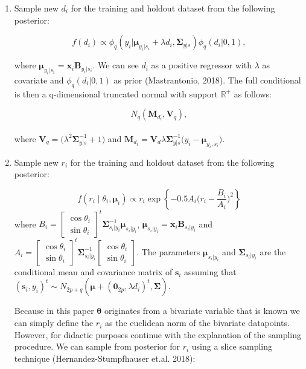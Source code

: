 \documentclass[11pt,]{article}
\begin{document}
\begin{appendices}
\begin{enumerate}
\item Sample new $d_i$ for the training and holdout dataset from the following posterior:

$$f(d_i) \propto \phi_q(y_i|\boldsymbol{\mu}_{y_i|s_i} + \lambda d_i, \boldsymbol{\Sigma}_{y|s})\phi_q(d_i|0, 1),$$

where $\boldsymbol{\mu}_{y_i|s_i} = \boldsymbol{x}_i\boldsymbol{B}_{y_i|s_i}$. We can see $d_i$ as a positive regressor with $\lambda$ as covariate and $\phi_q(d_i|0, 1)$ as prior (Mastrantonio, 2018). The full conditional is then a q-dimensional truncated normal with support $\mathbb{R}^{+}$ as follows:

$$N_q(\boldsymbol{M}_{d_i}, \boldsymbol{V}_q),$$ \\where $\boldsymbol{V}_q = \big(\lambda^2\boldsymbol{\Sigma}_{y|s}^{-1} + 1\big)$ and $\boldsymbol{M}_{d_i} = \boldsymbol{V}_d\lambda\boldsymbol{\Sigma}_{y|s}^{-1}\big(y_i - \boldsymbol{\mu}_{y_i, s_i}\big)$.

\item Sample new $r_i$ for the training and holdout dataset from the following posterior:

$$f(r_i \mid \theta_i, \boldsymbol{\mu}_i) \propto r_i \exp{\left\{-0.5A_i\bigg(r_i-\frac{B_i}{A_i}\bigg)^2\right\}}$$ 
where $B_i = \begin{bmatrix} \cos \theta_i \\ \sin \theta_i\end{bmatrix}^t\boldsymbol{\Sigma}_{s_i|y_i}^{-1}\boldsymbol{\mu}_{s_i|y_i}$, $\boldsymbol{\mu}_{s_i|y_i} = \boldsymbol{x}_i\boldsymbol{B}_{s_i|y_i}$ and $A_i = \begin{bmatrix} \cos \theta_i \\ \sin \theta_i\end{bmatrix}^t\boldsymbol{\Sigma}_{s_i| y_i}^{-1}\begin{bmatrix} \cos \theta_i \\ \sin \theta_i\end{bmatrix}$. The parameters $\boldsymbol{\mu}_{s_i|y_i}$ and $\boldsymbol{\Sigma}_{s_i| y_i}$ are the conditional mean and covariance matrix of $\boldsymbol{s}_i$ assuming that $(\boldsymbol{s}_i, y_i)^t \sim N_{2p+q}(\boldsymbol{\mu} + (\boldsymbol{0}_{2p}, \lambda d_i)^t, \boldsymbol{\Sigma})$.

Because in this paper $\boldsymbol{\theta}$ originates from a bivariate variable that is known we can simply define the $r_i$ as the euclidean norm of the bivariate datapoints. However, for didactic purposes continue with the explanation of the sampling procedure. We
can sample from posterior for $r_i$ using a slice sampling technique (Hernandez-Stumpfhauser et.al. 2018):


\end{enumerate}
\end{appendices}
\end{document}
